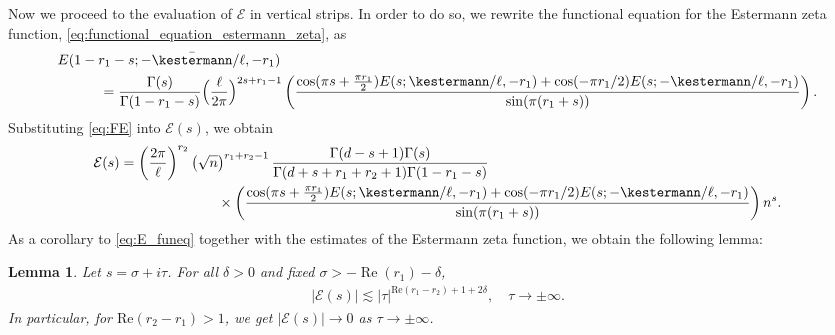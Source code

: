 \documentclass[]{article}
\newtheorem{lemma}[thm]{Lemma}
\renewcommand{\Re}{\operatorname{Re}}
\begin{document}
Now we proceed to the evaluation of $\mathcal{E}$ in vertical strips. In order to do so, we rewrite the functional equation for the Estermann zeta function, \eqref{eq:functional_equation_estermann_zeta}, as 
\begin{equation}\label{eq:FE}
	\begin{split}
&	 E(1-r_1-s ;  -\bar{\kestermann} / \ell, -r_1) \\
& \ \ \ \ \ \ \ \ \  = \frac{ \Gamma(s)      }{ \Gamma(1-r_1-s)  }  \Big(\frac{\ell}{2\pi}\Big)^{2 s+r_1-1} \left(  \frac{\cos(\pi s + \frac{\pi r_1}{2}) E(s;\kestermann/\ell,-r_1) + \cos(- \pi r_1/2 ) E(s;-\kestermann/\ell,-r_1)  }{\sin(\pi (r_1+s))} \right).
	\end{split}
\end{equation}
Substituting  \eqref{eq:FE} into $\mathcal{E}(s)$,
we obtain 
\begin{equation}\label{eq:E_funeq}
	\begin{split}
		\mathcal{E}(s) 
          &   = 		   \left( \frac{2 \pi }{\ell} \right)^{r_2}    \left(  \sqrt{n}  \right)^{r_1+r_2-1}    \frac{   \Gamma(d-s+1)   \Gamma(s)  }{\Gamma (d+s+r_1+r_2+1) \Gamma(1-r_1-s)  } \\
&      \ \ \ \ \ \ \ \ \  \ \ \ \ \ \  \ \ \ \ \ \  \times       \left(  \frac{\cos(\pi s + \frac{\pi r_1}{2}) E(s;\kestermann/\ell,-r_1) + \cos(- \pi r_1/2 ) E(s;-\kestermann/\ell,-r_1)  }{\sin(\pi (r_1+s))} \right) n^{s} .
    \end{split}
\end{equation}
As a corollary to \eqref{eq:E_funeq} together with the estimates of the Estermann zeta function, we obtain the following lemma:
\begin{lemma}\label{lem:contour} Let $s=\sigma+i\tau$. For all $\delta>0$ and fixed $\sigma > -\Re(r_1)- \delta$,
\begin{equation}\label{eq:asymp_Omega}
\begin{split}
    |\mathcal{E}(s) |   \lesssim |\tau|^{{\text{Re}(r_1-r_2)+1+2\delta}}, \quad \tau \to \pm \infty.
\end{split}
\end{equation}
In particular, for $\text{Re}(r_2-r_1) > 1$, we get $|\mathcal{E}(s)| \to 0$ as $\tau\to \pm \infty$. 
\end{lemma}
\end{document}
